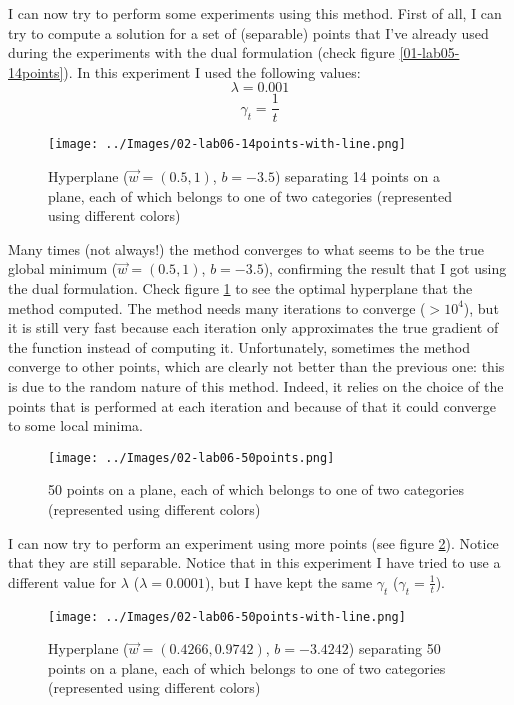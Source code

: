     I can now try to perform some experiments using this method. First of all, I can try to compute a solution for a set of (separable) points that I've already used during the experiments with the dual formulation (check figure \ref{01-lab05-14points}). In this experiment I used the following values:
    \[\lambda = 0.001\]
    \[\gamma_t = \frac{1}{t}\]
    \begin{figure}
        \centering
        \texttt{[image: ../Images/02-lab06-14points-with-line.png]}
        \caption{Hyperplane (\(\vec{w} = (0.5, 1)\), \(b=-3.5\)) separating 14 points on a plane, each of which belongs to one of two categories (represented using different colors)}
        \label{02-lab06-14points-with-line}
    \end{figure}
    Many times (not always!) the method converges to what seems to be the true global minimum (\(\vec{w} = (0.5, 1)\), \(b=-3.5\)), confirming the result that I got using the dual formulation. Check figure \ref{02-lab06-14points-with-line} to see the optimal hyperplane that the method computed. The method needs many iterations to converge (\(>10^4\)), but it is still very fast because each iteration only approximates the true gradient of the function instead of computing it. Unfortunately, sometimes the method converge to other points, which are clearly not better than the previous one: this is due to the random nature of this method. Indeed, it relies on the choice of the points that is performed at each iteration and because of that it could converge to some local minima.\par
    \begin{figure}
        \centering
        \texttt{[image: ../Images/02-lab06-50points.png]}
        \caption{50 points on a plane, each of which belongs to one of two categories (represented using different colors)}
        \label{02-lab06-50points}
    \end{figure}
    I can now try to perform an experiment using more points (see figure \ref{02-lab06-50points}). Notice that they are still separable. Notice that in this experiment I have tried to use a different value for \(\lambda\) (\(\lambda = 0.0001\)), but I have kept the same \(\gamma_t\) (\(\gamma_t = \frac{1}{t}\)).
    \begin{figure}
        \centering
        \texttt{[image: ../Images/02-lab06-50points-with-line.png]}
        \caption{Hyperplane (\(\vec{w} = (0.4266, 0.9742)\), \(b=-3.4242\)) separating 50 points on a plane, each of which belongs to one of two categories (represented using different colors)}
        \label{02-lab06-50points-with-line}
    \end{figure}
